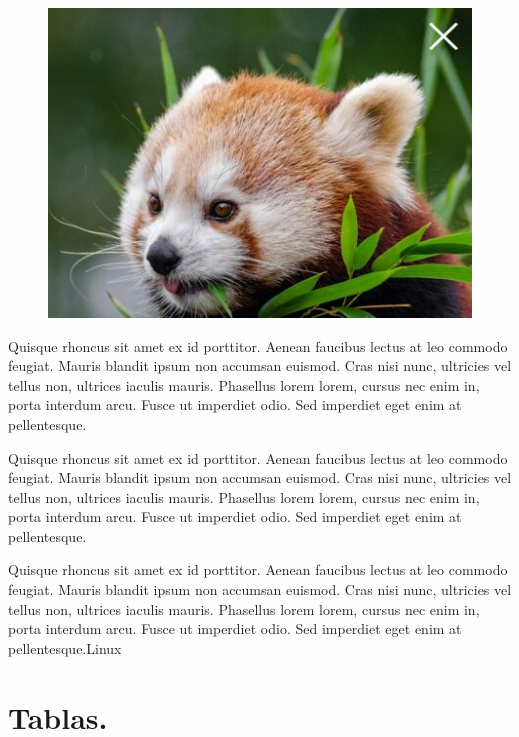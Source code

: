 	\begin{figure}[H]
		\begin{center}
			\includegraphics[width = 0.8\GlLineWidth]{rsc/img/TestImage}
		\end{center} 
	\end{figure}
	
	Quisque rhoncus sit amet ex id porttitor. Aenean faucibus lectus at leo commodo feugiat. Mauris blandit ipsum non accumsan euismod. Cras nisi nunc, ultricies vel tellus non, ultrices iaculis mauris. Phasellus lorem lorem, cursus nec enim in, porta interdum arcu. Fusce ut imperdiet odio. Sed imperdiet eget enim at pellentesque.
	
	Quisque rhoncus sit amet ex id porttitor. Aenean faucibus lectus at leo commodo feugiat. Mauris blandit ipsum non accumsan euismod. Cras nisi nunc, ultricies vel tellus non, ultrices iaculis mauris. Phasellus lorem lorem, cursus nec enim in, porta interdum arcu. Fusce ut imperdiet odio. Sed imperdiet eget enim at pellentesque.\cite{IEEEreferencias:Ref1} 
	
	Quisque rhoncus sit amet ex id porttitor. Aenean faucibus lectus at leo commodo feugiat. Mauris blandit ipsum non accumsan euismod. Cras nisi nunc, ultricies vel tellus non, ultrices iaculis mauris. Phasellus lorem lorem, cursus nec enim in, porta interdum arcu. Fusce ut imperdiet odio. Sed imperdiet eget enim at pellentesque.\gls{Linux}
	
	
	
\section{Tablas.}
	
